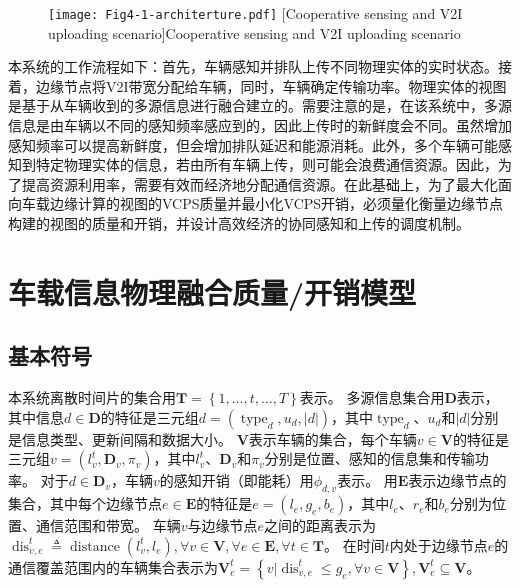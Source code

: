\begin{figure}[h]
\centering
  \texttt{[image: Fig4-1-architerture.pdf]}
  [Cooperative sensing and V2I uploading scenario]{Cooperative sensing and V2I uploading scenario}
  \label{fig 4-1}
\end{figure} 

本系统的工作流程如下：首先，车辆感知并排队上传不同物理实体的实时状态。接着，边缘节点将V2I带宽分配给车辆，同时，车辆确定传输功率。物理实体的视图是基于从车辆收到的多源信息进行融合建立的。需要注意的是，在该系统中，多源信息是由车辆以不同的感知频率感应到的，因此上传时的新鲜度会不同。虽然增加感知频率可以提高新鲜度，但会增加排队延迟和能源消耗。此外，多个车辆可能感知到特定物理实体的信息，若由所有车辆上传，则可能会浪费通信资源。因此，为了提高资源利用率，需要有效而经济地分配通信资源。在此基础上，为了最大化面向车载边缘计算的视图的VCPS质量并最小化VCPS开销，必须量化衡量边缘节点构建的视图的质量和开销，并设计高效经济的协同感知和上传的调度机制。

\section[\hspace{-2pt}车载信息物理融合质量/开销模型]{{ \hspace{-8pt}车载信息物理融合质量/开销模型}}\label{section 4-3}

\subsection[\hspace{-2pt}基本符号]{{ \hspace{-8pt}基本符号}}

本系统离散时间片的集合用$\mathbf{T}=\left\{1,\ldots,t,\ldots, T \right\}$表示。
多源信息集合用$\mathbf{D}$表示，其中信息$d \in \mathbf{D}$的特征是三元组$d=\left(\operatorname{type}_d, u_d, \left|d\right| \right)$，其中$\operatorname{type}_d$、$u_d$和$\left|d\right|$分别是信息类型、更新间隔和数据大小。
$\mathbf{V}$表示车辆的集合，每个车辆$v\in \mathbf{V}$的特征是三元组$v=\left (l_v^t, \mathbf{D}_v, \pi_v \right )$，其中$l_v^t$、$\mathbf{D}_v$和$\pi_v$分别是位置、感知的信息集和传输功率。
对于$d \in \mathbf{D}_v$，车辆$v$的感知开销（即能耗）用$\phi_{d, v}$表示。
用$\mathbf{E}$表示边缘节点的集合，其中每个边缘节点$e \in \mathbf{E}$的特征是$e=\left (l_e, g_e, b_e \right)$，其中$l_{e}$、$r_{e}$和$b_{e}$分别为位置、通信范围和带宽。
车辆$v$与边缘节点$e$之间的距离表示为$\operatorname{dis}_{v, e}^t \triangleq \operatorname{distance} \left (l_v^t, l_e \right ), \forall v \in \mathbf{V}, \forall e \in \mathbf{E}, \forall t \in \mathbf{T}$。
在时间$t$内处于边缘节点$e$的通信覆盖范围内的车辆集合表示为$\mathbf{V}_e^t=\left \{v \vert \operatorname{dis}_{v, e}^t \leq g_e, \forall v \in \mathbf{V} \right \}, \mathbf{V}_e^t \subseteq \mathbf{V}$。

